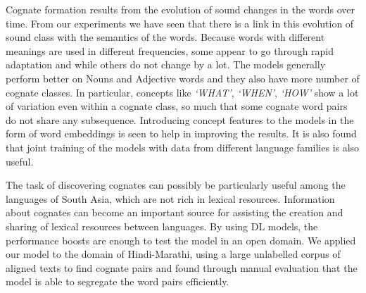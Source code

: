\documentclass[11pt,letterpaper]{article}
\begin{document}
Cognate formation results from the evolution of sound changes in the words over time. From our experiments we have seen that there is a link in this evolution of sound class with the semantics of the words. Because words with different meanings are used in different frequencies, some appear to go through rapid adaptation and while others do not change by a lot. The models generally perform better on Nouns and Adjective words and they also have more number of cognate classes. In particular, concepts like \textit{`WHAT'}, \textit{`WHEN'}, \textit{`HOW'} show a lot of variation even within a cognate class, so much that some cognate word pairs do not share any subsequence. Introducing concept features to the models in the form of word embeddings is seen to help in improving the results. It is also found that joint training of the models with data from different language families is also useful.

The task of discovering cognates can possibly be particularly useful among the languages of South Asia, which are not rich in lexical resources. Information about cognates can become an important source for assisting the creation and sharing of lexical resources between languages. By using DL models, the performance boosts are enough to test the model in an open domain. We applied our model to the domain of Hindi-Marathi, using a large unlabelled corpus of aligned texts to find cognate pairs and found through manual evaluation that the model is able to segregate the word pairs efficiently. 




\end{document}
